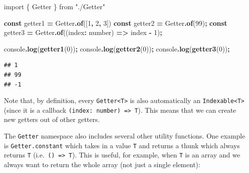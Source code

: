 \documentclass[
]{book}
\newenvironment{Shaded}{\begin{snugshade}}{\end{snugshade}}
\newcommand{\BuiltInTok}[1]{#1}
\newcommand{\DataTypeTok}[1]{\textcolor[rgb]{0.13,0.29,0.53}{#1}}
\newcommand{\DecValTok}[1]{\textcolor[rgb]{0.00,0.00,0.81}{#1}}
\newcommand{\FunctionTok}[1]{\textcolor[rgb]{0.13,0.29,0.53}{\textbf{#1}}}
\newcommand{\ImportTok}[1]{#1}
\newcommand{\KeywordTok}[1]{\textcolor[rgb]{0.13,0.29,0.53}{\textbf{#1}}}
\newcommand{\NormalTok}[1]{#1}
\newcommand{\OperatorTok}[1]{\textcolor[rgb]{0.81,0.36,0.00}{\textbf{#1}}}
\newcommand{\StringTok}[1]{\textcolor[rgb]{0.31,0.60,0.02}{#1}}
\theoremstyle{definition}
\theoremstyle{definition}
\theoremstyle{definition}
\theoremstyle{definition}
\theoremstyle{remark}
\begin{document}
\begin{Shaded}
\begin{Highlighting}[]
\ImportTok{import}\NormalTok{ \{ Getter \} }\ImportTok{from} \StringTok{"./Getter"}

\KeywordTok{const}\NormalTok{ getter1 }\OperatorTok{=}\NormalTok{ Getter}\OperatorTok{.}\FunctionTok{of}\NormalTok{([}\DecValTok{1}\OperatorTok{,} \DecValTok{2}\OperatorTok{,} \DecValTok{3}\NormalTok{])}
\KeywordTok{const}\NormalTok{ getter2 }\OperatorTok{=}\NormalTok{ Getter}\OperatorTok{.}\FunctionTok{of}\NormalTok{(}\DecValTok{99}\NormalTok{)}\OperatorTok{;}
\KeywordTok{const}\NormalTok{ getter3 }\OperatorTok{=}\NormalTok{ Getter}\OperatorTok{.}\FunctionTok{of}\NormalTok{((index}\OperatorTok{:} \DataTypeTok{number}\NormalTok{) }\KeywordTok{=\textgreater{}}\NormalTok{ index }\OperatorTok{{-}} \DecValTok{1}\NormalTok{)}\OperatorTok{;}

\BuiltInTok{console}\OperatorTok{.}\FunctionTok{log}\NormalTok{(}\FunctionTok{getter1}\NormalTok{(}\DecValTok{0}\NormalTok{))}\OperatorTok{;}
\BuiltInTok{console}\OperatorTok{.}\FunctionTok{log}\NormalTok{(}\FunctionTok{getter2}\NormalTok{(}\DecValTok{0}\NormalTok{))}\OperatorTok{;}
\BuiltInTok{console}\OperatorTok{.}\FunctionTok{log}\NormalTok{(}\FunctionTok{getter3}\NormalTok{(}\DecValTok{0}\NormalTok{))}\OperatorTok{;}
\end{Highlighting}
\end{Shaded}

\begin{verbatim}
## 1
## 99
## -1
\end{verbatim}

Note that, by definition, every \texttt{Getter\textless{}T\textgreater{}} is also automatically an \texttt{Indexable\textless{}T\textgreater{}} (since it is a callback \texttt{(index:\ number)\ =\textgreater{}\ T}). This means that we can create new getters out of other getters.

The \texttt{Getter} namespace also includes several other utility functions. One example is \texttt{Getter.constant} which takes in a value \texttt{T} and returns a thunk which always returns \texttt{T} (i.e.~\texttt{()\ =\textgreater{}\ T}). This is useful, for example, when \texttt{T} is an array and we always want to return the whole array (not just a single element):
\end{document}
